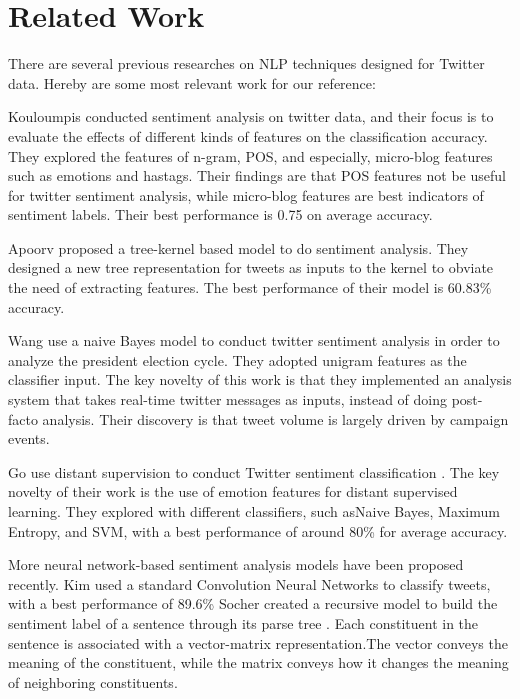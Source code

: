 
\section{Related Work}  
%
There are several previous researches on NLP techniques designed for Twitter data. Hereby are some most relevant work for our reference:

Kouloumpis \etal conducted sentiment analysis on twitter data, and their focus is to evaluate the effects of different kinds of features on the classification accuracy\cite{kouloumpis2011twitter}.
%
They explored the features of n-gram, POS, and especially, micro-blog features such as emotions and hastags.
%
Their findings are that POS features not be useful for twitter sentiment analysis, while micro-blog features are best indicators of sentiment labels.
%
Their best performance is 0.75 on average accuracy.

Apoorv \etal  proposed a tree-kernel based model to do sentiment analysis\cite{agarwal2011sentiment}. 
%
They designed a new tree representation for tweets as inputs to the kernel to obviate the need of extracting features.
%
The best performance of their model is 60.83\% accuracy.

Wang \etal use a naive Bayes model to  conduct twitter sentiment analysis in order to analyze the president election cycle\cite{wang2012system}.
%
They adopted unigram features as the classifier input.
%
The key novelty of this work is that they implemented an analysis system that takes real-time twitter messages as inputs, instead of doing post-facto analysis.
%
Their discovery is that tweet volume is largely driven by campaign events.

Go \etal use distant supervision to conduct Twitter sentiment classification \cite{go2009twitter}.
%
The key novelty of their work is the use of emotion features for distant supervised learning.
%
They explored with different classifiers, such asNaive Bayes, Maximum Entropy, and SVM, with a best performance of around 80\%  for  average accuracy.
 
More neural network-based sentiment analysis models have been proposed recently.
%
Kim \etal used a standard Convolution Neural Networks to classify tweets, with a best performance of 89.6\%
% 
Socher \etal created a recursive model to build the sentiment label of a sentence through its parse tree \cite{socher2012semantic}. 
%
Each constituent in the sentence is associated with a vector-matrix representation.The vector conveys the meaning of the constituent, while the matrix conveys how it changes the meaning of neighboring constituents.

 